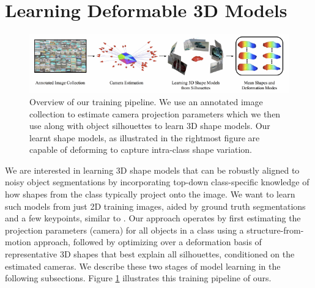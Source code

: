 \section{Learning Deformable 3D Models}

\begin{figure}[htb!]
\includegraphics[width = \textwidth]{figures/categoryshapes/figTrain.pdf}
\caption{Overview of our training pipeline. We use an annotated image collection to estimate camera projection parameters which we then use along with object silhouettes to learn 3D shape models. Our learnt shape models, as illustrated in the rightmost figure are capable of deforming to capture intra-class shape variation.}
\label{fig:figtrain}
\end{figure}

We are interested in learning 3D shape models that can be robustly aligned to noisy object segmentations by incorporating top-down class-specific knowledge of how shapes from the class typically project onto the image. We want to learn such models from just 2D training images, aided by ground truth segmentations and a few keypoints, similar to \cite{carvi14}. Our approach operates by first estimating the projection parameters (camera) for all objects in a class using a structure-from-motion approach, followed by optimizing over a deformation basis of representative 3D shapes that best explain all silhouettes, conditioned on the estimated cameras. We describe these two stages of model learning in the following subsections. Figure \ref{fig:figtrain} illustrates this training pipeline of ours.



%


